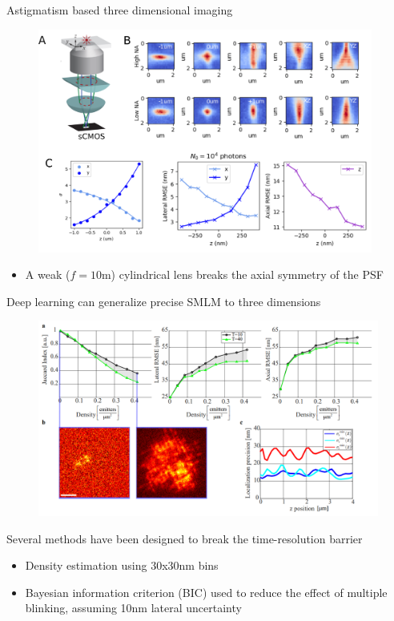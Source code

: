 \documentclass{beamer}					%
\begin{document}
\begin{frame}{Astigmatism based three dimensional imaging}
\begin{figure}
\includegraphics[width=11cm]{Astigmatism.png}
\end{figure}
\begin{itemize}
\item A weak ($f=10$m) cylindrical lens breaks the axial symmetry of the PSF
\end{itemize}
\end{frame}


\begin{frame}{Deep learning can generalize precise SMLM to three dimensions}
\begin{figure}
\includegraphics[width=12cm]{Jaccard.png}
\end{figure}
Several methods have been designed to break the time-resolution barrier
\begin{itemize}
\item Density estimation using 30x30nm bins
\item Bayesian information criterion (BIC) used to reduce the effect of multiple blinking, assuming 10nm lateral uncertainty
\end{itemize}
\end{frame}
\end{document}
